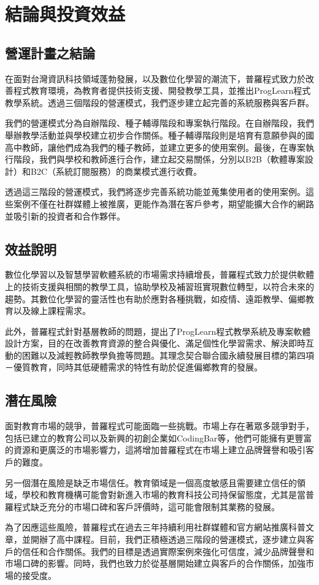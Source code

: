 \section{結論與投資效益}

\subsection{營運計畫之結論}

在面對台灣資訊科技領域蓬勃發展，以及數位化學習的潮流下，普羅程式致力於改善程式教育環境，為教育者提供技術支援、開發教學工具，並推出ProgLearn程式教學系統。透過三個階段的營運模式，我們逐步建立起完善的系統服務與客戶群。

我們的營運模式分為自辦階段、種子輔導階段和專案執行階段。在自辦階段，我們舉辦教學活動並與學校建立初步合作關係。種子輔導階段則是培育有意願參與的國高中教師，讓他們成為我們的種子教師，並建立更多的使用案例。最後，在專案執行階段，我們與學校和教師進行合作，建立起交易關係，分別以B2B（軟體專案設計）和B2C（系統訂閱服務）的商業模式進行收費。

透過這三階段的營運模式，我們將逐步完善系統功能並蒐集使用者的使用案例。這些案例不僅在社群媒體上被推廣，更能作為潛在客戶參考，期望能擴大合作的網路並吸引新的投資者和合作夥伴。

\subsection{效益說明}

數位化學習以及智慧學習軟體系統的市場需求持續增長，普羅程式致力於提供軟體上的技術支援與相關的教學工具，協助學校及補習班實現數位轉型，以符合未來的趨勢。其數位化學習的靈活性也有助於應對各種挑戰，如疫情、遠距教學、偏鄉教育以及線上課程需求。

此外，普羅程式針對基層教師的問題，提出了ProgLearn程式教學系統及專案軟體設計方案，目的在改善教育資源的整合與優化、滿足個性化學習需求、解決即時互動的困難以及減輕教師教學負擔等問題。其理念契合聯合國永續發展目標的第四項－優質教育，同時其低硬體需求的特性有助於促進偏鄉教育的發展。

\subsection{潛在風險}

面對教育市場的競爭，普羅程式可能面臨一些挑戰。市場上存在著眾多競爭對手，包括已建立的教育公司以及新興的初創企業如CodingBar等，他們可能擁有更豐富的資源和更廣泛的市場影響力，這將增加普羅程式在市場上建立品牌聲譽和吸引客戶的難度。

另一個潛在風險是缺乏市場信任。教育領域是一個高度敏感且需要建立信任的領域，學校和教育機構可能會對新進入市場的教育科技公司持保留態度，尤其是當普羅程式缺乏充分的市場口碑和客戶評價時，這可能會限制其業務的發展。

為了因應這些風險，普羅程式在過去三年持續利用社群媒體和官方網站推廣科普文章，並開辦了高中課程。目前，我們正積極透過三階段的營運模式，逐步建立與客戶的信任和合作關係。我們的目標是透過實際案例來強化可信度，減少品牌聲譽和市場口碑的影響。同時，我們也致力於從基層開始建立與客戶的合作關係，加強市場的接受度。